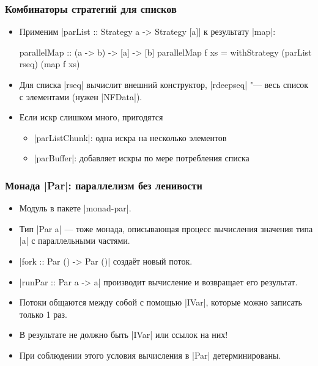 \documentclass[11pt]{beamer}
\begin{document}
\begin{frame}[fragile]
  \frametitle{Комбинаторы стратегий для списков}
  \begin{itemize}
    \item Применим \haskinline|parList :: Strategy a -> Strategy [a]| к результату \haskinline|map|:
          \begin{haskell}
            parallelMap :: (a -> b) -> [a] -> [b]
            parallelMap f xs = 
              withStrategy (parList rseq) (map f xs)
          \end{haskell}
          \pause
    \item Для списка \haskinline|rseq| вычислит внешний конструктор, \haskinline|rdeepseq| "--- весь список с элементами (нужен \haskinline|NFData|).
    \item Если искр слишком много, пригодятся
          \begin{itemize}
            \item \haskinline|parListChunk|: одна искра на несколько элементов
            \item \haskinline|parBuffer|: добавляет искры по мере потребления списка
          \end{itemize}
  \end{itemize}
\end{frame}

\begin{frame}[fragile]
  \frametitle{Монада \haskinline|Par|: параллелизм без ленивости}
  \begin{itemize}
    \item Модуль \href{https://hackage.haskell.org/package/monad-par/docs/Control-Monad-Par.html}{} в пакете \haskinline|monad-par|.
    \item Тип \haskinline|Par a| --- тоже монада, описывающая процесс вычисления значения типа \haskinline|a| с параллельными частями.
    \item \haskinline|fork :: Par () -> Par ()| создаёт новый поток.
    \item \haskinline|runPar :: Par a -> a| производит вычисление и возвращает его результат. \pause
    \item Потоки общаются между собой с помощью \haskinline|IVar|, которые можно записать только 1 раз.
    \item В результате не должно быть \haskinline|IVar| или ссылок на них!
    \item При соблюдении этого условия вычисления в \haskinline|Par| детерминированы.
  \end{itemize}
\end{frame}
\end{document}
